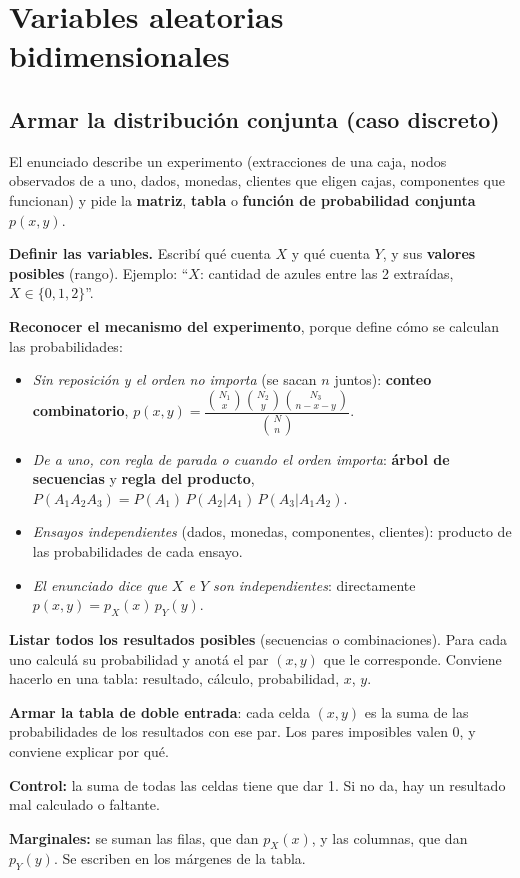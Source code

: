 \newpage
\section{Variables aleatorias bidimensionales}

\subsection{Armar la distribución conjunta (caso discreto)}\label{p:conjunta}
\begin{cuando}
El enunciado describe un experimento (extracciones de una caja, nodos observados de a uno, dados, monedas, clientes que eligen cajas, componentes que funcionan) y pide la \textbf{matriz}, \textbf{tabla} o \textbf{función de probabilidad conjunta} $p(x,y)$.
\end{cuando}
\begin{pasos}
\begin{pasolista}
\item \textbf{Definir las variables.} Escribí qué cuenta $X$ y qué cuenta $Y$, y sus \textbf{valores posibles} (rango). Ejemplo: ``$X$: cantidad de azules entre las 2 extraídas, $X\in\{0,1,2\}$''.
\item \textbf{Reconocer el mecanismo del experimento}, porque define cómo se calculan las probabilidades:
\begin{itemize}
\item \emph{Sin reposición y el orden no importa} (se sacan $n$ juntos): \textbf{conteo combinatorio},
$p(x,y)=\dfrac{\binom{N_1}{x}\binom{N_2}{y}\binom{N_3}{n-x-y}}{\binom{N}{n}}$.
\item \emph{De a uno, con regla de parada o cuando el orden importa}: \textbf{árbol de secuencias} y \textbf{regla del producto}, $P(A_1A_2A_3)=P(A_1)\,P(A_2|A_1)\,P(A_3|A_1A_2)$.
\item \emph{Ensayos independientes} (dados, monedas, componentes, clientes): producto de las probabilidades de cada ensayo.
\item \emph{El enunciado dice que $X$ e $Y$ son independientes}: directamente $p(x,y)=p_X(x)\,p_Y(y)$.
\end{itemize}
\item \textbf{Listar todos los resultados posibles} (secuencias o combinaciones). Para cada uno calculá su probabilidad y anotá el par $(x,y)$ que le corresponde. Conviene hacerlo en una tabla: resultado, cálculo, probabilidad, $x$, $y$.
\item \textbf{Armar la tabla de doble entrada}: cada celda $(x,y)$ es la suma de las probabilidades de los resultados con ese par. Los pares imposibles valen 0, y conviene explicar por qué.
\item \textbf{Control:} la suma de todas las celdas tiene que dar 1. Si no da, hay un resultado mal calculado o faltante.
\item \textbf{Marginales:} se suman las filas, que dan $p_X(x)$, y las columnas, que dan $p_Y(y)$. Se escriben en los márgenes de la tabla.
\end{pasolista}
\end{pasos}
